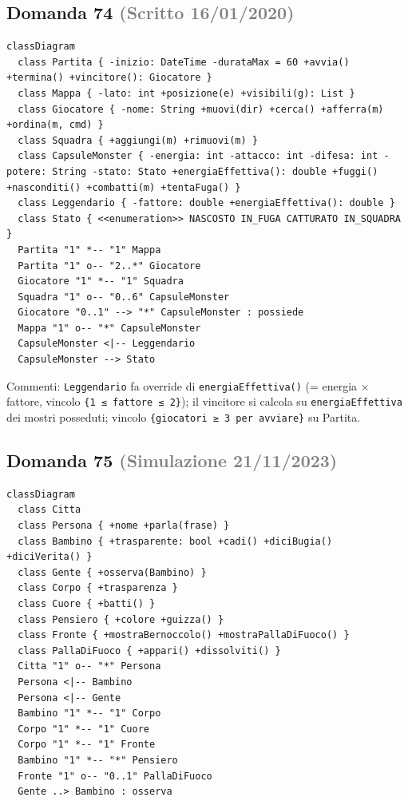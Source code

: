 \documentclass[a4paper,11pt]{article}
\begin{document}
\subsection*{Domanda 74 \hfill {\small \textcolor{gray}{(Scritto 16/01/2020)}}}


\begin{verbatim}
classDiagram
  class Partita { -inizio: DateTime -durataMax = 60 +avvia() +termina() +vincitore(): Giocatore }
  class Mappa { -lato: int +posizione(e) +visibili(g): List }
  class Giocatore { -nome: String +muovi(dir) +cerca() +afferra(m) +ordina(m, cmd) }
  class Squadra { +aggiungi(m) +rimuovi(m) }
  class CapsuleMonster { -energia: int -attacco: int -difesa: int -potere: String -stato: Stato +energiaEffettiva(): double +fuggi() +nasconditi() +combatti(m) +tentaFuga() }
  class Leggendario { -fattore: double +energiaEffettiva(): double }
  class Stato { <<enumeration>> NASCOSTO IN_FUGA CATTURATO IN_SQUADRA }
  Partita "1" *-- "1" Mappa
  Partita "1" o-- "2..*" Giocatore
  Giocatore "1" *-- "1" Squadra
  Squadra "1" o-- "0..6" CapsuleMonster
  Giocatore "0..1" --> "*" CapsuleMonster : possiede
  Mappa "1" o-- "*" CapsuleMonster
  CapsuleMonster <|-- Leggendario
  CapsuleMonster --> Stato
\end{verbatim}
Commenti: \texttt{Leggendario} fa override di \texttt{energiaEffettiva()} (= energia × fattore, vincolo \texttt{\{1 ≤ fattore ≤ 2\}}); il vincitore si calcola su \texttt{energiaEffettiva} dei mostri posseduti; vincolo \texttt{\{giocatori ≥ 3 per avviare\}} su Partita.



\subsection*{Domanda 75 \hfill {\small \textcolor{gray}{(Simulazione 21/11/2023)}}}


\begin{verbatim}
classDiagram
  class Citta
  class Persona { +nome +parla(frase) }
  class Bambino { +trasparente: bool +cadi() +diciBugia() +diciVerita() }
  class Gente { +osserva(Bambino) }
  class Corpo { +trasparenza }
  class Cuore { +batti() }
  class Pensiero { +colore +guizza() }
  class Fronte { +mostraBernoccolo() +mostraPallaDiFuoco() }
  class PallaDiFuoco { +appari() +dissolviti() }
  Citta "1" o-- "*" Persona
  Persona <|-- Bambino
  Persona <|-- Gente
  Bambino "1" *-- "1" Corpo
  Corpo "1" *-- "1" Cuore
  Corpo "1" *-- "1" Fronte
  Bambino "1" *-- "*" Pensiero
  Fronte "1" o-- "0..1" PallaDiFuoco
  Gente ..> Bambino : osserva
\end{verbatim}
\end{document}

